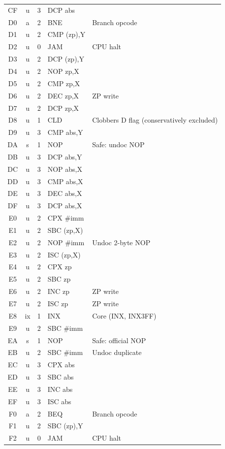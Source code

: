 \documentclass{article}
\begin{document}
{\begin{longtable}{@{}ccclp{4.8cm}@{}}
CF & u  & 3 & DCP abs & \\
D0 & a  & 2 & BNE & Branch opcode \\
D1 & u  & 2 & CMP (zp),Y & \\
D2 & u  & 0 & JAM & CPU halt \\
D3 & u  & 2 & DCP (zp),Y & \\
D4 & u  & 2 & NOP zp,X & \\
D5 & u  & 2 & CMP zp,X & \\
D6 & u  & 2 & DEC zp,X & ZP write \\
D7 & u  & 2 & DCP zp,X & \\
D8 & u  & 1 & CLD & Clobbers D flag (conservatively excluded) \\
D9 & u  & 3 & CMP abs,Y & \\
DA & s  & 1 & NOP & Safe: undoc NOP \\
DB & u  & 3 & DCP abs,Y & \\
DC & u  & 3 & NOP abs,X & \\
DD & u  & 3 & CMP abs,X & \\
DE & u  & 3 & DEC abs,X & \\
DF & u  & 3 & DCP abs,X & \\
E0 & u  & 2 & CPX \#imm & \\
E1 & u  & 2 & SBC (zp,X) & \\
E2 & u  & 2 & NOP \#imm & Undoc 2-byte NOP \\
E3 & u  & 2 & ISC (zp,X) & \\
E4 & u  & 2 & CPX zp & \\
E5 & u  & 2 & SBC zp & \\
E6 & u  & 2 & INC zp & ZP write \\
E7 & u  & 2 & ISC zp & ZP write \\
E8 & ix & 1 & INX & Core (INX, INX3FF) \\
E9 & u  & 2 & SBC \#imm & \\
EA & s  & 1 & NOP & Safe: official NOP \\
EB & u  & 2 & SBC \#imm & Undoc duplicate \\
EC & u  & 3 & CPX abs & \\
ED & u  & 3 & SBC abs & \\
EE & u  & 3 & INC abs & \\
EF & u  & 3 & ISC abs & \\
F0 & a  & 2 & BEQ & Branch opcode \\
F1 & u  & 2 & SBC (zp),Y & \\
F2 & u  & 0 & JAM & CPU halt \\

\end{longtable}}
\end{document}
